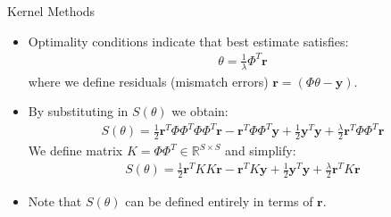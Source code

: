 \documentclass[handout,9pt]{beamer}
\begin{document}

\begin{frame}{Kernel Methods}
\begin{itemize}
  \setlength{\itemsep}{10pt}
\item Optimality conditions indicate that best estimate satisfies:
\begin{align*}
\theta=\frac{1}{\lambda}\Phi^T\mathbf{r}
\end{align*}
where we define residuals (mismatch errors) $\mathbf{r}=(\Phi\theta-\mathbf{y})$.  

\item By substituting in $S(\theta)$ we obtain:
\begin{align*}
S(\theta)= \frac{1}{2}\mathbf{r}^T\Phi\Phi^T\Phi\Phi^T\mathbf{r}-\mathbf{r}^T\Phi\Phi^T\mathbf{y}+\frac{1}{2}\mathbf{y}^T\mathbf{y}+\frac{\lambda}{2}\mathbf{r}^T\Phi\Phi^T\mathbf{r}
\end{align*}
We define matrix $K=\Phi\Phi^T\in \mathbb{R}^{S\times S}$ and simplify:
\begin{align*}
S(\theta)= \frac{1}{2}\mathbf{r}^TKK\mathbf{r}-\mathbf{r}^TK\mathbf{y}+\frac{1}{2}\mathbf{y}^T\mathbf{y}+\frac{\lambda}{2}\mathbf{r}^TK\mathbf{r}
\end{align*}
\item Note that $S(\theta)$ can be defined entirely in terms of $\mathbf{r}$. 

\end{itemize}

\end{frame}

\end{document}
